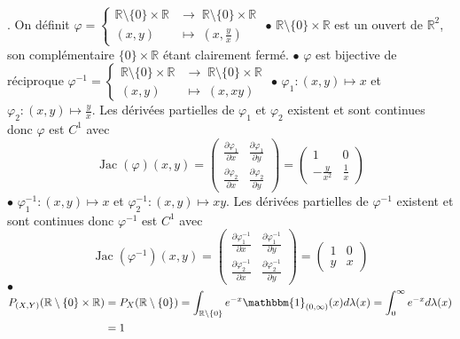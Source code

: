 \documentclass{report}
\begin{document}
. On définit 
 $\varphi=
    \begin{cases}
      \mathbb R\setminus \{0\} \times \mathbb R & \longrightarrow \; \mathbb R\setminus \{0\} \times \mathbb R \\
      (x,y) & \longmapsto \; (x,\frac yx)
    \end{cases}$ \newline
$\bullet$ $\mathbb R\setminus \{0\} \times \mathbb R$ est un ouvert de $\mathbb R^2$, son complémentaire $\{0\} \times \mathbb R$ étant clairement fermé. \newline
$\bullet$ $\varphi$ est bijective de réciproque $\varphi^{-1}=
    \begin{cases}
      \mathbb R\setminus \{0\} \times \mathbb R & \longrightarrow \; \mathbb R\setminus \{0\} \times \mathbb R \\
      (x,y) & \longmapsto \; (x, xy)
    \end{cases}$ \newline
$\bullet$ $\varphi_1\colon (x,y) \mapsto x$ et $\varphi_2\colon (x,y) \mapsto \frac yx$. Les dérivées partielles de $\varphi_1$ et $\varphi_2$  existent et sont continues donc $\varphi$ est $C^1$ avec $$ \operatorname{Jac}(\varphi)(x,y)  =\begin{pmatrix} 
\frac{\partial \varphi_1}{\partial x} & \frac{\partial \varphi_1}{\partial y} \\
\frac{\partial \varphi_2}{\partial x} & \frac{\partial \varphi_2}{\partial y}
\end{pmatrix} = \begin{pmatrix}
1 & 0 \\
-\frac{y}{x^2} & \frac{1}{x}
\end{pmatrix}$$ \newline 
$\bullet$ $\varphi^{-1}_1\colon (x,y) \mapsto x$ et $\varphi^{-1}_2\colon (x,y) \mapsto xy$. Les dérivées partielles de $\varphi^{-1}$ existent et sont continues donc $\varphi^{-1}$ est $C^1$ avec $$ \operatorname{Jac}(\varphi^{-1})(x,y)  =\begin{pmatrix} 
\frac{\partial \varphi^{-1}_1}{\partial x} & \frac{\partial \varphi^{-1}_1}{\partial y} \\
\frac{\partial \varphi^{-1}_2}{\partial x} & \frac{\partial \varphi^{-1}_2}{\partial y}
\end{pmatrix} = \begin{pmatrix}
1 & 0 \\
y & x
\end{pmatrix}$$\newline
$\bullet$ $\displaystyle \begin{aligned}[t] P_{(X,Y)}(\mathbb R\setminus \{0\} \times \mathbb R) &= P_X(\mathbb R\setminus \{0\})=\int_{\mathbb R\setminus \{0\}} e^{-x}\mathbbm{1}_{(0,\infty)}(x) d\lambda(x)=\int_0^\infty e^{-x} d\lambda(x)\\ &=1 \end{aligned}$\newline
\end{document}
